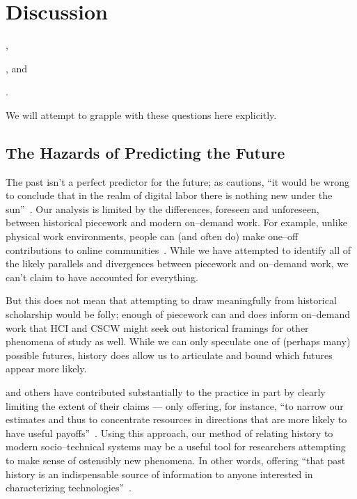 \documentclass[trackingWork]{subfiles}
\begin{document}
\section{Discussion}
\begin{inlinelist}
  \item {},
  \item {}, and
  \item {}.
\end{inlinelist}
We will attempt to grapple with these questions here explicitly.


\subsection{The Hazards of Predicting the Future}\label{sec:perilousProblemsPredicting}
The past isn't a perfect predictor for the future;
as \citeauthor{scholz2012digital} cautions,
``it would be wrong to conclude that in the realm of digital labor there is nothing new under the sun''~\cite{scholz2012digital}.
Our analysis is limited by the differences, foreseen and unforeseen, between historical piecework and modern on--demand work.
For example, unlike physical work environments, people can (and often do) make one--off contributions to online communities~\cite{mcinnis2016one}.
While we have attempted to identify all of the likely parallels and divergences between piecework and on--demand work,
we can't claim to have accounted for everything.

But this does not mean that attempting to draw meaningfully from historical scholarship would be folly;
enough of piecework can and does inform on--demand work that
HCI and CSCW might seek out historical framings for other phenomena of study as well.
While we can only speculate one of (perhaps many) possible futures, history does allow us to articulate and bound which futures appear more likely.

\citeauthor{rosenberg1994exploring} and others have contributed substantially to the practice in part by clearly limiting the extent of their claims
--- only offering, for instance,
``to narrow our estimates and thus to concentrate resources in directions that are more likely to have useful payoffs''~\cite{rosenberg1994exploring}.
Using this approach,
our method of relating history to modern socio--technical systems may be
a useful tool for researchers attempting
to make sense of ostensibly new phenomena.
In other words, offering ``that past history is an indispensable source of information
to anyone interested in characterizing technologies''~\cite{rosenberg1982inside}.
\end{document}
